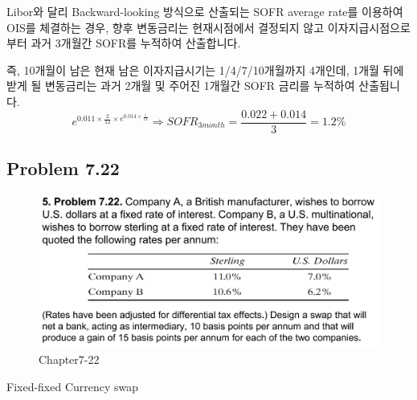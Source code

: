 \documentclass[
  letterpaper,
  DIV=11,
  numbers=noendperiod]{scrreprt}
\begin{document}
\begin{tcolorbox}[enhanced jigsaw, toprule=.15mm, breakable, left=2mm, leftrule=.75mm, opacitybacktitle=0.6, coltitle=black, rightrule=.15mm, colback=white, titlerule=0mm, bottomtitle=1mm, colframe=quarto-callout-note-color-frame, title=\textcolor{quarto-callout-note-color}{\faInfo}\hspace{0.5em}{OIS vs.~Libor-IRS}, toptitle=1mm, arc=.35mm, colbacktitle=quarto-callout-note-color!10!white, opacityback=0, bottomrule=.15mm]

Libor와 달리 Backward-looking 방식으로 산출되는 SOFR average rate를
이용하여 OIS를 체결하는 경우, 향후 변동금리는 현재시점에서 결정되지 않고
이자지급시점으로부터 과거 3개월간 SOFR를 누적하여 산출합니다.

즉, 10개월이 남은 현재 남은 이자지급시기는 1/4/7/10개월까지 4개인데,
1개월 뒤에 받게 될 변동금리는 과거 2개월 및 주어진 1개월간 SOFR 금리를
누적하여 산출됩니다.
\[e^{0.011\times\frac{2}{12}\times e^{0.014\times\frac{1}{12}}}\Rightarrow SOFR_{3month}=\frac{0.022+0.014}{3}=1.2\%\]

\end{tcolorbox}

\subsection*{\texorpdfstring{\textbf{Problem
7.22}}{Problem 7.22}}\label{problem-7.22}

\begin{figure}[H]

{\centering \includegraphics{images/선물옵션_7-22.png}

}

\caption{Chapter7-22}

\end{figure}%

Fixed-fixed Currency swap
\end{document}
